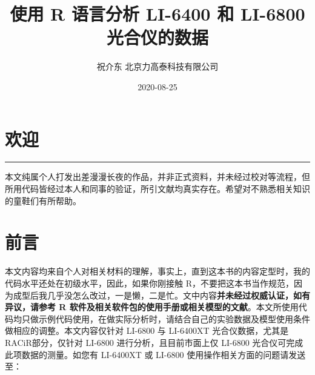 \documentclass[
]{krantz}
\title{使用 R 语言分析 LI-6400 和 LI-6800 光合仪的数据}
\author{祝介东 北京力高泰科技有限公司}
\date{2020-08-25}
\begin{document}
\maketitle





\thispagestyle{empty}

\setlength{\abovedisplayskip}{-5pt}
\setlength{\abovedisplayshortskip}{-5pt}

{
\hypersetup{linkcolor=}
\setcounter{tocdepth}{2}
\tableofcontents
}
\listoftables
\listoffigures
\hypertarget{welcome}{%
\chapter*{欢迎}\label{welcome}}


\begin{center}\rule{0.5\linewidth}{0.5pt}\end{center}

本文纯属个人打发出差漫漫长夜的作品，并非正式资料，并未经过校对等流程，但所用代码皆经过本人和同事的验证，所引文献均真实存在。希望对不熟悉相关知识的童鞋们有所帮助。

\frontmatter

\hypertarget{frontmatter}{%
\chapter*{前言}\label{frontmatter}}


本文内容均来自个人对相关材料的理解，事实上，直到这本书的内容定型时，我的代码水平还处在初级水平，因此，如果你刚接触 R，不要把这本书当作规范，因为成型后我几乎没怎么改过，一是懒，二是忙。文中内容\textbf{并未经过权威认证，如有异议，请参考 R 软件及相关软件包的使用手册或相关模型的文献}。本文所使用代码均只做示例代码使用，在做实际分析时，请结合自己的实验数据及模型使用条件做相应的调整。本文内容仅针对
LI-6800 与 LI-6400XT 光合仪数据，尤其是 RACiR\texttrademark 部分，仅针对 LI-6800
进行分析，且目前市面上仅 LI-6800 光合仪可完成此项数据的测量。如您有 LI-6400XT 或 LI-6800 使用操作相关方面的问题请发送至：
\end{document}
